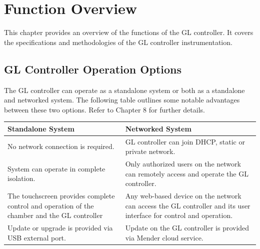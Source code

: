 \chapter{Function Overview}

This chapter provides an overview of the functions of the GL controller.
It covers the specifications and methodologies of the GL controller
instrumentation.


\section{GL Controller Operation
Options}

The GL controller can operate as a standalone system or both as a
standalone and networked system. The following table outlines some
notable advantages between these two options. Refer to Chapter 8 for
further details.

\begin{longtable}[]{@{}ll@{}}
\toprule
\begin{minipage}[b]{0.48\columnwidth}\raggedright
Standalone System\strut
\end{minipage} & \begin{minipage}[b]{0.46\columnwidth}\raggedright
Networked System\strut
\end{minipage}\tabularnewline
\midrule
\endhead
\begin{minipage}[t]{0.48\columnwidth}\raggedright
No network connection is required.\strut
\end{minipage} & \begin{minipage}[t]{0.46\columnwidth}\raggedright
GL controller can join DHCP, static or private network.\strut
\end{minipage}\tabularnewline
\begin{minipage}[t]{0.48\columnwidth}\raggedright
System can operate in complete isolation.\strut
\end{minipage} & \begin{minipage}[t]{0.46\columnwidth}\raggedright
Only authorized users on the network can remotely access and operate the
GL controller.\strut
\end{minipage}\tabularnewline
\begin{minipage}[t]{0.48\columnwidth}\raggedright
The touchscreen provides complete control and operation of the chamber
and the GL controller\strut
\end{minipage} & \begin{minipage}[t]{0.46\columnwidth}\raggedright
Any web-based device on the network can access the GL controller and its
user interface for control and operation.\strut
\end{minipage}\tabularnewline
\begin{minipage}[t]{0.48\columnwidth}\raggedright
Update or upgrade is provided via USB external port.\strut
\end{minipage} & \begin{minipage}[t]{0.46\columnwidth}\raggedright
Update on the GL controller is provided via Mender cloud service.\strut
\end{minipage}\tabularnewline
\bottomrule
\end{longtable}


